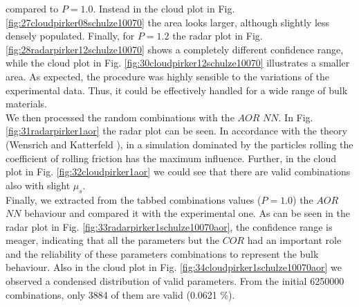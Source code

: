 compared to $P=1.0$. Instead in the cloud plot in Fig. 
\ref{fig:27cloudpirker08schulze10070} the area
looks larger, although slightly less densely populated. Finally, for $P=1.2$ the radar plot in Fig.
\ref{fig:28radarpirker12schulze10070} shows a completely different confidence
range, while the cloud plot in Fig. \ref{fig:30cloudpirker12schulze10070} 
illustrates a smaller area. As expected, the procedure was highly sensible to the variations of the experimental data. 
Thus, it could be effectively handled for a wide range of bulk materials.\\
% 
We then processed the random combinations with the $AOR$ $NN$. In Fig.
\ref{fig:31radarpirker1aor} the radar plot can be seen. In accordance with the
theory (Wensrich and Katterfeld \cite{RefWorks:87}), in a simulation dominated
by the particles rolling the coefficient of rolling friction has the maximum influence. 
Further, in the cloud plot in Fig. \ref{fig:32cloudpirker1aor}
we could see that there are valid combinations also with slight $\mu_s$. \\
Finally, we extracted from the tabbed combinations values ($P=1.0$) the $AOR$ $NN$ behaviour and compared it with the experimental one. 
As can be seen in the radar plot in Fig.
\ref{fig:33radarpirker1schulze10070aor}, the confidence range is meager, indicating that all the parameters but the $COR$ 
had an important role and the reliability of these parameters combinations to represent the bulk behaviour. 
Also in the cloud plot in Fig. \ref{fig:34cloudpirker1schulze10070aor} we
observed a condensed distribution of valid parameters.
From the initial 6250000 combinations, only 3884 of them are valid (0.0621 \%).







%
%
%
%
%
% 
% 
% 




